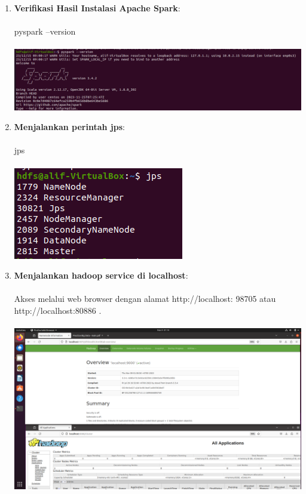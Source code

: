 \begin{enumerate}
\item \textbf {Verifikasi Hasil Instalasi Apache Spark}: \\ \\
\colorbox{BurntOrange}{pyspark --version} \\ \\
\includegraphics[scale=.4]{Gambar/empat} \\

\item \textbf {Menjalankan perintah jps}: \\ \\
\colorbox{BurntOrange}{jps} \\ \\
\includegraphics[scale=.4]{Gambar/lima} \\

\item \textbf {Menjalankan hadoop service di localhost}: \\ \\
\colorbox{BurntOrange}{Akses melalui web browser dengan alamat http://localhost: 98705 atau http://localhost:80886
.} \\ \\
\includegraphics[scale=.2]{Gambar/hadoop sukses} \\


\end{enumerate}
